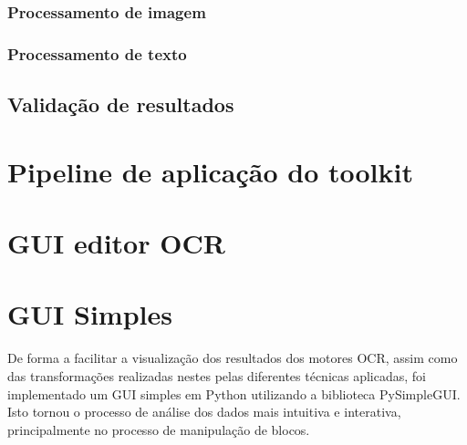 
\label{contribution_categorize_blocks}


\label{contribution_divide_blocks}


\label{contribution_reading_order}

\label{contribution_result_segmentation}



\subsubsection{Processamento de imagem}
\label{contribution_image_processing}

\subsubsection{Processamento de texto}
\label{contribution_text_processing}


\subsection{Validação de resultados}
\label{contribution_results_validation}




\section{Pipeline de aplicação do toolkit}
\label{contribution_toolkit_pipeline}


\section{GUI editor OCR}
\label{contribution_ocr_editor}


\section{GUI Simples}
\label{gui_simples}

De forma a facilitar a visualização dos resultados dos motores OCR, assim como das transformações realizadas nestes pelas diferentes técnicas aplicadas, foi implementado um GUI simples em Python utilizando a biblioteca PySimpleGUI. Isto tornou o processo de análise dos dados mais intuitiva e interativa, principalmente no processo de manipulação de blocos.

